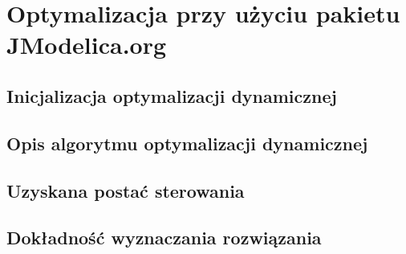 \section{Optymalizacja przy użyciu pakietu JModelica.org}
\label{sec:opt}


\subsection{Inicjalizacja optymalizacji dynamicznej}
\label{sub:opt-init}

\subsection{Opis algorytmu optymalizacji dynamicznej}


\subsection{Uzyskana postać sterowania}
\label{sub:opt-ctrl-form}


\subsection{Dokładność wyznaczania rozwiązania}
\label{sub:opt-dokladnosc}
